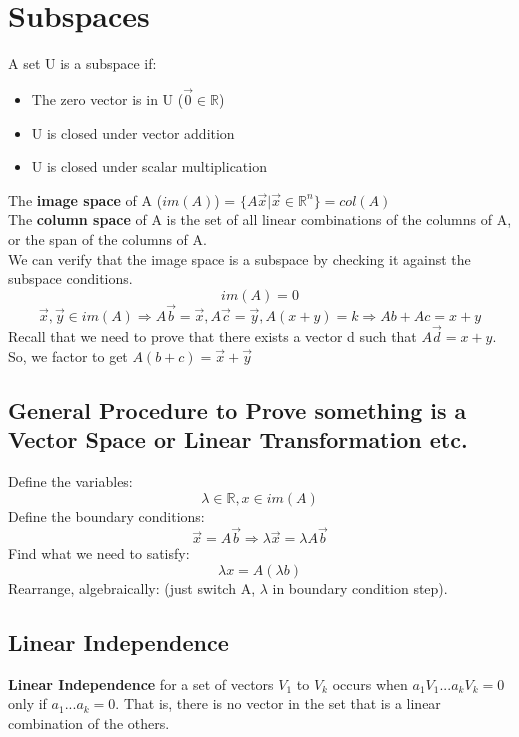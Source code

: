 \documentclass[10pt, twocolumn] {article}
\begin{document}
     \section{Subspaces}
     A set U is a subspace if:
     \begin{itemize}
         \item The zero vector is in U ($\vec 0 \in \mathbb{R}$)
         \item U is closed under vector addition
         \item U is closed under scalar multiplication
     \end{itemize}
     The \textbf{image space} of A ($im(A)$) = $\{A\vec x | \vec x \in \mathbb{R}^n\} = col(A)$ \\ The \textbf{column space} of A is the set of all linear combinations of the columns of A, or the span of the columns of A.\\ We can verify that the image space is a subspace by checking it against the subspace conditions.
     $$im(A) = 0$$
     $$\vec x, \vec y \in im(A) \Rightarrow A\vec b = \vec x, A\vec c = \vec y, A (x+y) = k \Rightarrow Ab + Ac = x + y$$ Recall that we need to prove that there exists a vector d such that $A\vec d = x +y$. So, we factor to get $A(b+c) = \vec x + \vec y$
     \subsection{General Procedure to Prove something is a Vector Space or Linear Transformation etc.}
     Define the variables:
     $$\lambda \in \mathbb{R}, x\in im(A)$$
     Define the boundary conditions:
     $$\vec x = A\vec b \Rightarrow \lambda \vec x = \lambda A \vec b$$
     Find what we need to satisfy:
     $$\lambda x = A (\lambda  b)$$
     Rearrange, algebraically:
     (just switch A, $\lambda$ in boundary condition step).
     \subsection{Linear Independence}
     \textbf{Linear Independence} for a set of vectors $V_1$ to $V_k$ occurs when $a_1V_1 ... a_kV_k = 0$ only if $a_1 ... a_k = 0$. That is, there is no vector in the set that is a linear combination of the others.
\end{document}

